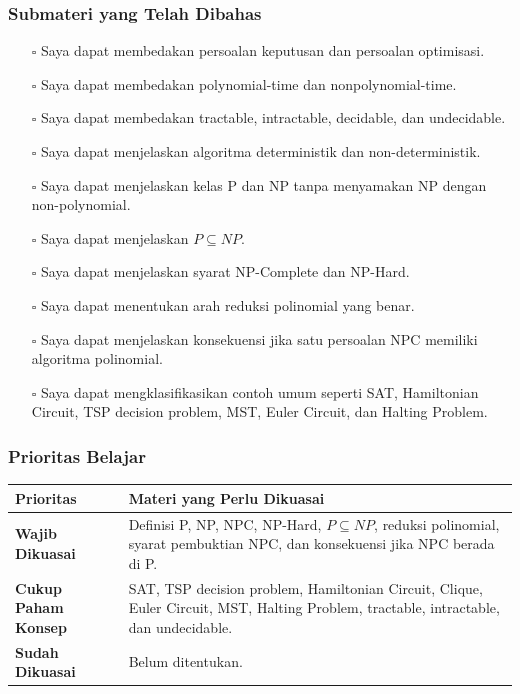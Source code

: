 \subsubsection{Submateri yang Telah Dibahas}
\begin{itemize}
    \item[$\square$] Saya dapat membedakan persoalan keputusan dan persoalan optimisasi.
    \item[$\square$] Saya dapat membedakan polynomial-time dan nonpolynomial-time.
    \item[$\square$] Saya dapat membedakan tractable, intractable, decidable, dan undecidable.
    \item[$\square$] Saya dapat menjelaskan algoritma deterministik dan non-deterministik.
    \item[$\square$] Saya dapat menjelaskan kelas P dan NP tanpa menyamakan NP dengan non-polynomial.
    \item[$\square$] Saya dapat menjelaskan $P\subseteq NP$.
    \item[$\square$] Saya dapat menjelaskan syarat NP-Complete dan NP-Hard.
    \item[$\square$] Saya dapat menentukan arah reduksi polinomial yang benar.
    \item[$\square$] Saya dapat menjelaskan konsekuensi jika satu persoalan NPC memiliki algoritma polinomial.
    \item[$\square$] Saya dapat mengklasifikasikan contoh umum seperti SAT, Hamiltonian Circuit, TSP decision problem, MST, Euler Circuit, dan Halting Problem.
\end{itemize}

\subsubsection{Prioritas Belajar}
\begin{tabularx}{\textwidth}{|L{0.22\textwidth}|X|}
\hline
\textbf{Prioritas} & \textbf{Materi yang Perlu Dikuasai} \\
\hline
\textbf{Wajib Dikuasai} & Definisi P, NP, NPC, NP-Hard, $P\subseteq NP$, reduksi polinomial, syarat pembuktian NPC, dan konsekuensi jika NPC berada di P. \\
\hline
\textbf{Cukup Paham Konsep} & SAT, TSP decision problem, Hamiltonian Circuit, Clique, Euler Circuit, MST, Halting Problem, tractable, intractable, dan undecidable. \\
\hline
\textbf{Sudah Dikuasai} & Belum ditentukan. \\
\hline
\end{tabularx}
